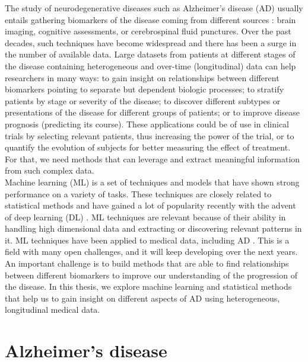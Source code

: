 The study of neurodegenerative diseases such as Alzheimer's disease (AD) usually entails gathering biomarkers of the disease coming from different sources \cite{Jack2010}: brain imaging, cognitive assessments, or cerebrospinal fluid punctures. Over the past decades, such techniques have become widespread and there has been a surge in the number of available data. Large datasets from patients at different stages of the disease containing heterogeneous and over-time (longitudinal) data can help researchers in many ways: to gain insight on relationships between different biomarkers pointing to separate but dependent biologic processes; to stratify patients by stage or severity of the disease; to discover different subtypes or presentations of the disease for different groups of patients; or to improve disease prognosis (predicting its course). These applications could be of use in clinical trials by selecting relevant patients, thus increasing the power of the trial, or to quantify the evolution of subjects for better measuring the effect of treatment. For that, we need methods that can leverage and extract meaningful information from such complex data. \\

Machine learning (ML) is a set of techniques and models that have shown strong performance on a variety of tasks. These techniques are closely related to statistical methods and have gained a lot of popularity recently with the advent of deep learning (DL) \cite{LeCun2015}. ML techniques are relevant because of their ability in handling high dimensional data and extracting or discovering relevant patterns in it. ML techniques have been applied to medical data, including AD \cite{Litjens2017,Ching2018}. This is a field with many open challenges, and it will keep developing over the next years. An important challenge is to build methods that are able to find relationships between different biomarkers to improve our understanding of the progression of the disease. In this thesis, we explore machine learning and statistical methods that help us to gain insight on different aspects of AD using heterogeneous, longitudinal medical data. \\

\section{Alzheimer's disease}

